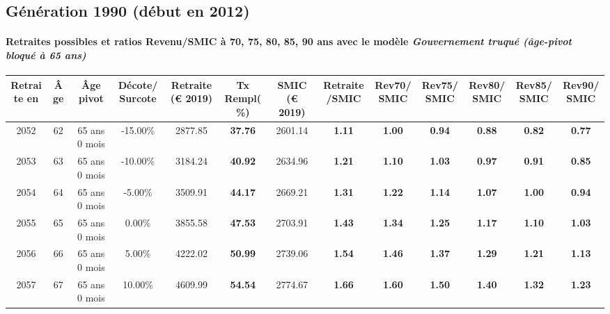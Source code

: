 \newpage 
 
\subsection{Génération 1990 (début en 2012)} 

\paragraph{Retraites possibles et ratios Revenu/SMIC à 70, 75, 80, 85, 90 ans avec le modèle \emph{Gouvernement truqué (âge-pivot bloqué à 65 ans)}}  
 
{ \scriptsize \begin{center} 
\begin{tabular}[htb]{|c|c||c|c||c|c||c||c|c|c|c|c|c|} 
\hline 
 Retraite en &  Âge &  Âge pivot &  Décote/Surcote &  Retraite (\euro{} 2019) &  Tx Rempl(\%) &  SMIC (\euro{} 2019) &  Retraite/SMIC &  Rev70/SMIC &  Rev75/SMIC &  Rev80/SMIC &  Rev85/SMIC &  Rev90/SMIC \\ 
\hline \hline 
 2052 &  62 &  65 ans 0 mois &  -15.00\% &  2877.85 &  {\bf 37.76} &  2601.14 &  {\bf 1.11} &  {\bf {\color{red} 1.00}} &  {\bf {\color{red} 0.94}} &  {\bf {\color{red} 0.88}} &  {\bf {\color{red} 0.82}} &  {\bf {\color{red} 0.77}} \\ 
\hline 
 2053 &  63 &  65 ans 0 mois &  -10.00\% &  3184.24 &  {\bf 40.92} &  2634.96 &  {\bf 1.21} &  {\bf 1.10} &  {\bf 1.03} &  {\bf {\color{red} 0.97}} &  {\bf {\color{red} 0.91}} &  {\bf {\color{red} 0.85}} \\ 
\hline 
 2054 &  64 &  65 ans 0 mois &  -5.00\% &  3509.91 &  {\bf 44.17} &  2669.21 &  {\bf 1.31} &  {\bf 1.22} &  {\bf 1.14} &  {\bf 1.07} &  {\bf 1.00} &  {\bf {\color{red} 0.94}} \\ 
\hline 
 2055 &  65 &  65 ans 0 mois &  0.00\% &  3855.58 &  {\bf 47.53} &  2703.91 &  {\bf 1.43} &  {\bf 1.34} &  {\bf 1.25} &  {\bf 1.17} &  {\bf 1.10} &  {\bf 1.03} \\ 
\hline 
 2056 &  66 &  65 ans 0 mois &  5.00\% &  4222.02 &  {\bf 50.99} &  2739.06 &  {\bf 1.54} &  {\bf 1.46} &  {\bf 1.37} &  {\bf 1.29} &  {\bf 1.21} &  {\bf 1.13} \\ 
\hline 
 2057 &  67 &  65 ans 0 mois &  10.00\% &  4609.99 &  {\bf 54.54} &  2774.67 &  {\bf 1.66} &  {\bf 1.60} &  {\bf 1.50} &  {\bf 1.40} &  {\bf 1.32} &  {\bf 1.23} \\ 
\hline 
\hline 
\end{tabular} 
\end{center} } 

